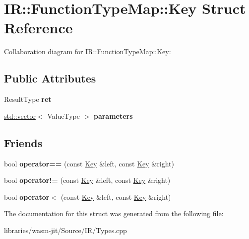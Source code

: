 \hypertarget{struct_i_r_1_1_function_type_map_1_1_key}{}\section{IR\+:\+:Function\+Type\+Map\+:\+:Key Struct Reference}
\label{struct_i_r_1_1_function_type_map_1_1_key}


Collaboration diagram for IR\+:\+:Function\+Type\+Map\+:\+:Key\+:
\subsection*{Public Attributes}
\begin{DoxyCompactItemize}
\item 
\mbox{\label{struct_i_r_1_1_function_type_map_1_1_key_a83bdeee267729ef2fb396c3ff1a19cdb}} 
Result\+Type {\bfseries ret}
\item 
\mbox{\label{struct_i_r_1_1_function_type_map_1_1_key_a84103ba67a22768e9c3748fda0039706}} 
\mbox{\hyperlink{classstd_1_1vector}{std\+::vector}}$<$ Value\+Type $>$ {\bfseries parameters}
\end{DoxyCompactItemize}
\subsection*{Friends}
\begin{DoxyCompactItemize}
\item 
\mbox{\label{struct_i_r_1_1_function_type_map_1_1_key_a481c0209a586f90210cb198aa311f8c6}} 
bool {\bfseries operator==} (const \mbox{\hyperlink{struct_i_r_1_1_function_type_map_1_1_key}{Key}} \&left, const \mbox{\hyperlink{struct_i_r_1_1_function_type_map_1_1_key}{Key}} \&right)
\item 
\mbox{\label{struct_i_r_1_1_function_type_map_1_1_key_a99e738313f5addc1dfe0d6cc9221d391}} 
bool {\bfseries operator!=} (const \mbox{\hyperlink{struct_i_r_1_1_function_type_map_1_1_key}{Key}} \&left, const \mbox{\hyperlink{struct_i_r_1_1_function_type_map_1_1_key}{Key}} \&right)
\item 
\mbox{\label{struct_i_r_1_1_function_type_map_1_1_key_a3f90f7845a6aab918d452a18cdfcd145}} 
bool {\bfseries operator$<$} (const \mbox{\hyperlink{struct_i_r_1_1_function_type_map_1_1_key}{Key}} \&left, const \mbox{\hyperlink{struct_i_r_1_1_function_type_map_1_1_key}{Key}} \&right)
\end{DoxyCompactItemize}


The documentation for this struct was generated from the following file\+:\begin{DoxyCompactItemize}
\item 
libraries/wasm-\/jit/\+Source/\+I\+R/Types.\+cpp\end{DoxyCompactItemize}
